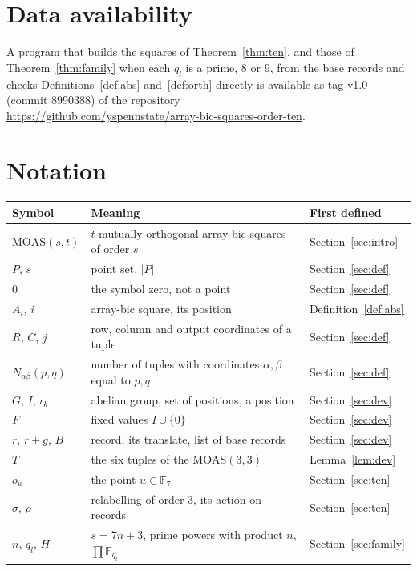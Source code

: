 \documentclass[11pt]{amsart}
\theoremstyle{definition}\newtheorem{definition}[theorem]{Definition}
\theoremstyle{remark}\newtheorem{remark}[theorem]{Remark}
\newcommand{\MOAS}{\mathrm{MOAS}}
\begin{document}
\section*{Data availability}
A program that builds the squares of Theorem~\ref{thm:ten}, and those of Theorem~\ref{thm:family} when each $q_l$ is a
prime, $8$ or $9$, from the base records and checks Definitions~\ref{def:abs} and~\ref{def:orth} directly is available
as tag v1.0 (commit 8990388) of the repository\\
\url{https://github.com/yspennstate/array-bic-squares-order-ten}.

\clearpage
\appendix
\section{Notation}
\begin{center}\scriptsize
\begin{tabular}{l p{6.4cm} p{2.6cm}}
\toprule
Symbol & Meaning & First defined\\
\midrule
$\MOAS(s,t)$ & $t$ mutually orthogonal array-bic squares of order $s$ & Section~\ref{sec:intro}\\
$P$, $s$ & point set, $|P|$ & Section~\ref{sec:def}\\
$0$ & the symbol zero, not a point & Section~\ref{sec:def}\\
$A_i$, $i$ & array-bic square, its position & Definition~\ref{def:abs}\\
$R$, $C$, $j$ & row, column and output coordinates of a tuple & Section~\ref{sec:def}\\
$N_{\alpha\beta}(p,q)$ & number of tuples with coordinates $\alpha,\beta$ equal to $p,q$ & Section~\ref{sec:def}\\
$G$, $I$, $\iota_k$ & abelian group, set of positions, a position & Section~\ref{sec:dev}\\
$F$ & fixed values $I\cup\{0\}$ & Section~\ref{sec:dev}\\
$r$, $r+g$, $B$ & record, its translate, list of base records & Section~\ref{sec:dev}\\
$T$ & the six tuples of the $\MOAS(3,3)$ & Lemma~\ref{lem:dev}\\
$o_u$ & the point $u\in\mathbb F_7$ & Section~\ref{sec:ten}\\
$\sigma$, $\rho$ & relabelling of order $3$, its action on records & Section~\ref{sec:ten}\\
$n$, $q_l$, $H$ & $s=7n+3$, prime powers with product $n$, $\prod\mathbb F_{q_l}$ & Section~\ref{sec:family}\\

\end{tabular}
\end{center}
\end{document}
